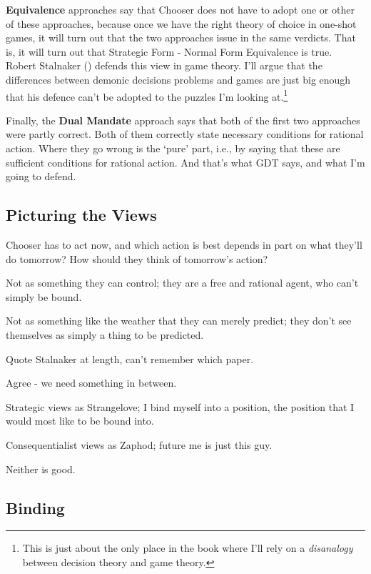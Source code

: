 \documentclass[
  12pt,
  letterpaper,
  DIV=11,
  numbers=noendperiod]{scrreprt}
\begin{document}
\textbf{Equivalence} approaches say that Chooser does not have to adopt
one or other of these approaches, because once we have the right theory
of choice in one-shot games, it will turn out that the two approaches
issue in the same verdicts. That is, it will turn out that Strategic
Form - Normal Form Equivalence is true. Robert Stalnaker
() defends this view in game theory.
I'll argue that the differences between demonic decisions problems and
games are just big enough that his defence can't be adopted to the
puzzles I'm looking at.\footnote{This is just about the only place in
  the book where I'll rely on a \emph{disanalogy} between decision
  theory and game theory.}

Finally, the \textbf{Dual Mandate} approach says that both of the first
two approaches were partly correct. Both of them correctly state
necessary conditions for rational action. Where they go wrong is the
`pure' part, i.e., by saying that these are sufficient conditions for
rational action. And that's what GDT says, and what I'm going to defend.

\subsection{Picturing the Views}\label{sec-four-pictures}

Chooser has to act now, and which action is best depends in part on what
they'll do tomorrow? How should they think of tomorrow's action?

Not as something they can control; they are a free and rational agent,
who can't simply be bound.

Not as something like the weather that they can merely predict; they
don't see themselves as simply a thing to be predicted.

Quote Stalnaker at length, can't remember which paper.

Agree - we need something in between.

Strategic views as Strangelove; I bind myself into a position, the
position that I would most like to be bound into.

Consequentialist views as Zaphod; future me is just this guy.

Neither is good.

\subsection{Binding}\label{sec-binding}
\end{document}
